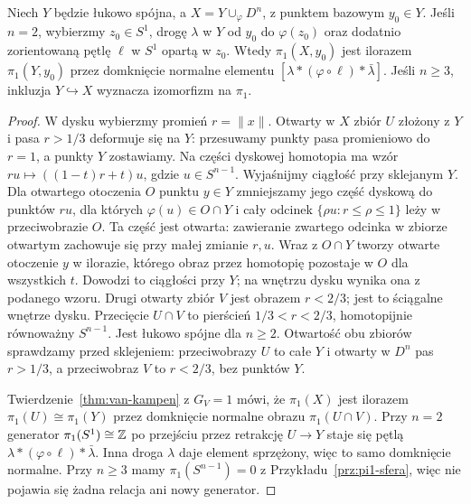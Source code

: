 \begin{twierdzenie}
\label{thm:pi1-dolaczenie-komorki}
Niech $Y$ będzie łukowo spójna,
a $X=Y\cup_\varphi D^n$, z punktem bazowym $y_0\in Y$.
Jeśli $n=2$, wybierzmy $z_0\in S^1$, drogę
$\lambda$ w $Y$ od $y_0$ do $\varphi(z_0)$ oraz
dodatnio zorientowaną pętlę $\ell$ w $S^1$ opartą w $z_0$.
Wtedy $\pi_1(X,y_0)$ jest ilorazem $\pi_1(Y,y_0)$
przez domknięcie normalne elementu
$[\lambda*(\varphi\circ\ell)*\bar\lambda]$.
Jeśli $n\geq3$, inkluzja
$Y\hookrightarrow X$ wyznacza izomorfizm na $\pi_1$.
\end{twierdzenie}
\begin{proof}
W dysku wybierzmy promień $r=\|x\|$.
Otwarty w $X$ zbiór $U$ złożony
z $Y$ i pasa $r>1/3$ deformuje
się na $Y$: przesuwamy punkty
pasa promieniowo do $r=1$,
a punkty $Y$ zostawiamy. Na części dyskowej homotopia ma wzór
$ru\mapsto((1-t)r+t)u$, gdzie $u\in S^{n-1}$.
Wyjaśnijmy ciągłość przy sklejanym $Y$. Dla otwartego otoczenia
$O$ punktu $y\in Y$ zmniejszamy jego część dyskową do punktów $ru$,
dla których $\varphi(u)\in O\cap Y$ i cały odcinek
$\{\rho u:r\leq\rho\leq1\}$ leży w przeciwobrazie $O$.
Ta część jest otwarta: zawieranie zwartego odcinka w zbiorze
otwartym zachowuje się przy małej zmianie $r,u$.
Wraz z $O\cap Y$ tworzy otwarte otoczenie $y$ w ilorazie,
którego obraz przez homotopię pozostaje w $O$ dla wszystkich $t$.
Dowodzi to ciągłości przy $Y$; na wnętrzu dysku wynika ona z podanego wzoru.
Drugi otwarty zbiór $V$ jest
obrazem $r<2/3$; jest to
ściągalne wnętrze dysku.
Przecięcie $U\cap V$ to pierścień
$1/3<r<2/3$, homotopijnie
równoważny $S^{n-1}$.
Jest łukowo spójne dla $n\geq2$.
Otwartość obu zbiorów sprawdzamy przed sklejeniem:
przeciwobrazy $U$ to całe $Y$ i otwarty w $D^n$ pas $r>1/3$,
a przeciwobraz $V$ to $r<2/3$, bez punktów $Y$.

Twierdzenie~\ref{thm:van-kampen}
z $G_V=1$ mówi, że $\pi_1(X)$
jest ilorazem $\pi_1(U)\cong\pi_1(Y)$
przez domknięcie normalne obrazu
$\pi_1(U\cap V)$. Przy $n=2$
generator $\pi_1(S^1)\cong\mathbb{Z}$
po przejściu przez retrakcję
$U\to Y$ staje się pętlą
$\lambda*(\varphi\circ\ell)*\bar\lambda$.
Inna droga $\lambda$ daje element sprzężony, więc
to samo domknięcie normalne.
Przy $n\geq3$ mamy
$\pi_1(S^{n-1})=0$ z
Przykładu~\ref{prz:pi1-sfera},
więc nie pojawia się żadna
relacja ani nowy generator.
\end{proof}

